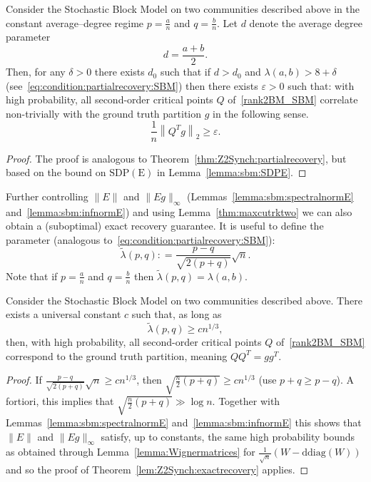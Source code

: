\documentclass{colt2016} %
\newcommand{\1}{\mathbf{1}}
\newcommand{\eps}{\varepsilon}
\newcommand{\ddiag}{\mathrm{ddiag}}
\newcommand{\defeq}{\mathrel{\mathop:}=}
\begin{document}
\begin{theorem}
 Consider the Stochastic Block Model on two communities described above in the constant average--degree regime $p=\frac{a}n$ and $q=\frac{b}n$. Let $d$ denote the average degree parameter
 \[
  d = \frac{a+b}2.
 \]
Then, for any $\delta>0$ there exists $d_0$ such that if $d>d_0$ and $\lambda(a,b) > 8+\delta$ (see~\eqref{eq:condition:partialrecovery:SBM}) then there exists $\eps>0$ such that: with high probability, all second-order critical points $Q$ of~\eqref{rank2BM_SBM} correlate non-trivially with the ground truth partition $g$ in the following sense.
\begin{equation}\label{eq:nontrivialcorrelation_0}
\frac1{n} \left\| Q^Tg\right\|_2 \geq \eps.
\end{equation}
\end{theorem}
\begin{proof}
The proof is analogous to Theorem~\ref{thm:Z2Synch:partialrecovery}, but based on the bound on $\mathrm{SDP(E)}$ in Lemma~\ref{lemma:sbm:SDPE}.
\end{proof}

Further controlling $\|E\|$ and $\|Eg\|_\infty$ (Lemmas~\ref{lemma:sbm:spectralnormE} and~\ref{lemma:sbm:infnormE}) and using Lemma~\ref{thm:maxcutrktwo} we can also obtain a (suboptimal) exact recovery guarantee. It is useful to define the parameter (analogous to~\eqref{eq:condition:partialrecovery:SBM}):
\[
 \tilde{\lambda}(p,q) \defeq \frac{p-q}{\sqrt{2(p+q)}}\sqrt{n}.
\]
Note that if $p=\frac{a}n$ and $q=\frac{b}n$ then $\tilde{\lambda}(p,q) =  \lambda(a,b)$.
\begin{theorem}
  Consider the Stochastic Block Model on two communities described above. There exists a universal constant $c$ such that, as long as
  \[
  \tilde{\lambda}(p,q) \geq cn^{1/3},
  \]
then, with high probability, all second-order critical points $Q$ of~\eqref{rank2BM_SBM} correspond to the ground truth partition, meaning $QQ^T = gg^T$.
\end{theorem}

\begin{proof}
If $\frac{p-q}{\sqrt{2(p+q)}}\sqrt{n} \geq cn^{1/3}$, then $\sqrt{\frac{n}{2}(p+q)}\geq cn^{1/3}$ (use $p+q \geq p-q$). A fortiori, this implies that $\sqrt{\frac{n}2(p+q)} \gg \log n$.
Together with Lemmas~\ref{lemma:sbm:spectralnormE} and~\ref{lemma:sbm:infnormE} this shows that $\|E\|$ and $\|Eg\|_\infty$ satisfy, up to constants, the same high probability bounds as obtained through Lemma~\ref{lemma:Wignermatrices} for $\frac1{\sqrt{n}}\left(W - \ddiag(W)\right)$ and so the proof of Theorem~\ref{lem:Z2Synch:exactrecovery} applies.
\end{proof}
\end{document}
